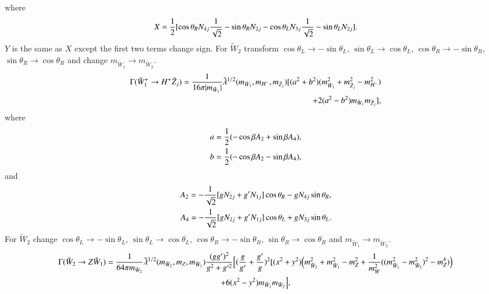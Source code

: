 \documentclass[final,3p,times,pdflatex]{elsarticle}
\begin{document}
where
\begin{equation}
\begin{aligned}
X = {1 \over 2} [\cos\theta_R N_{4j} {1 \over \sqrt{2}} - \sin\theta_R N_{2j} - \cos\theta_L N_{3j} {1 \over \sqrt{2}} - \sin\theta_L N_{2j}].
\end{aligned}
\end{equation}
$Y$ is the same as $X$ except the first two terms change sign.
For $\tilde{W}_2$ transform $\cos\theta_L \rightarrow -\sin\theta_L$, $\sin\theta_L \rightarrow \cos\theta_L$, $\cos\theta_R \rightarrow -\sin\theta_R$, $\sin\theta_R \rightarrow \cos\theta_R$ and change $m_{\tilde{W}_{1}} \rightarrow m_{\tilde{W}_2}$.
\begin{equation}\label{ch1Hpmneut}
\begin{aligned}
\Gamma (\tilde{W}_1^+ \rightarrow H^+ \tilde{Z}_j) = {1 \over 16\pi|m_{\tilde{W}_1}| } \tilde{\lambda}^{1/2} (m_{\tilde{W}_1}, m_{H^-}, m_{\tilde{Z}_j}) [(a^2 + b^2)(m_{\tilde{W}_{1}}^2 + m_{\tilde{Z}_{j}}^2 - m_{H^-}^2) \\ + 2(a^2 - b^2)m_{\tilde{W}_{1}}m_{\tilde{Z}_{j}}],
\end{aligned}
\end{equation} 
where
\begin{equation}
\begin{aligned}
a = {1 \over 2} (-\cos\beta A_2 + \sin\beta A_4), & \\
b = {1 \over 2} (-\cos\beta A_2 - \sin\beta A_4),
\end{aligned}
\end{equation}
and
\begin{equation}
\begin{aligned}
A_2 = -{1 \over \sqrt{2}} [g N_{2j} + g' N_{1j}]\cos\theta_{R} - g N_{4j} \sin\theta_{R},  & \\
A_4 = -{1 \over \sqrt{2}} [g N_{2j} + g' N_{1j}]\cos\theta_{L} + g N_{3j} \sin\theta_{L}.
\end{aligned}
\end{equation}
For $\tilde{W}_2$ change $\cos\theta_L \rightarrow -\sin\theta_L$, $\sin\theta_L \rightarrow \cos\theta_L$, $\cos\theta_R \rightarrow -\sin\theta_R$, $\sin\theta_R \rightarrow \cos\theta_R$ and $m_{\tilde{W}_{1}} \rightarrow m_{\tilde{W}_2}$.
\begin{multline}\label{ch2Zch1}
\Gamma (\tilde{W}_2 \rightarrow Z \tilde{W}_1) = {1 \over 64\pi m_{\tilde{W}_2} } \tilde{\lambda}^{1/2} (m_{\tilde{W}_2}, m_Z, m_{\tilde{W}_1}) {(gg')^2 \over g^2 + g'^2} \Big[({g \over g'} + {g' \over g})^2  [(x^2 + y^2) \Big(m_{\tilde{W}_{2}}^2  + m_{\tilde{W}_{1}}^2 - m_{Z}^2  + {1 \over m_{W}^2}(( m_{\tilde{W}_{1}}^2 - m_{\tilde{W}_{2}}^2)^2 -m_{Z}^4)\Big) \\  +6(x^2 - y^2)m_{\tilde{W}_{1}}m_{\tilde{W}_{2}}\Big] , 
\end{multline} 
\end{document}
